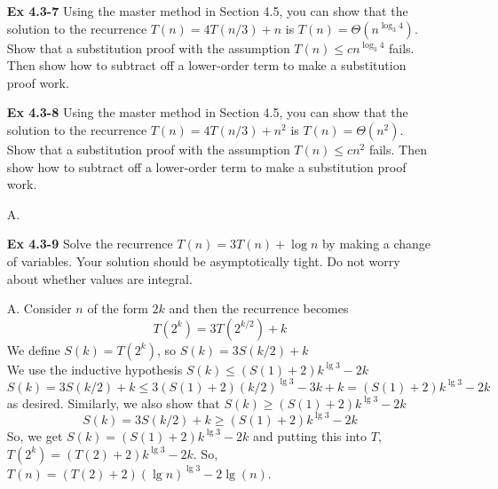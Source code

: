 \documentclass[fontsize=12pt,paper=a4]{book}
\begin{document}
\begin{enumerate}
	\item[\textbf{Ex 4.3-7}]
		Using the master method in Section 4.5, you can show that the solution to the recurrence $T(n) = 4T(n/3)+n$ is $T(n) = \Theta(n^{\log_3 4})$. Show that a substitution proof with the assumption $T(n) \leq cn^{\log_3 4}$ fails. Then show how to subtract off a lower-order term to make a substitution proof work.
		
	\item[\textbf{Ex 4.3-8}]
		Using the master method in Section 4.5, you can show that the solution to the recurrence $T(n) = 4T(n/3)+n^2$ is $T(n) = \Theta(n^2)$. Show that a substitution proof with the assumption $T(n) \leq cn^2$ fails. Then show how to subtract off a lower-order term to make a substitution proof work.
	\item[A.]

	\item[\textbf{Ex 4.3-9}]
		Solve the recurrence $T(n) = 3T(n) + \log n$ by making a change of variables. Your solution should be asymptotically tight. Do not worry about whether values are integral.
	\item[A.]
	Consider $n$ of the form $2k$ and then the recurrence becomes
	\[T(2^k) = 3T(2^{k/2}) + k\]
	We define $S(k) = T(2^k)$, so $S(k) = 3S(k/2) + k$ \\
	We use the inductive hypothesis $S(k) \leq (S(1)+2)k^{\lg 3} - 2k$
	\[ S(k) = 3S(k/2) + k \leq 3 (S(1) +2) (k/2)^{\lg 3} - 3k + k = (S(1) + 2)k^{\lg 3} - 2k \] 
	as desired. Similarly, we also show that $S(k) \geq (S(1) + 2)k^{\lg 3} - 2k$
	\[ S(k) = 3S(k/2) + k \geq (S(1) + 2)k^{\lg 3} - 2k\]
	So, we get $S(k) = (S(1) + 2)k^{\lg 3} - 2k$ and putting this into $T$, $T(2^k) = (T(2) + 2)k^{\lg 3} - 2k$. So, $T(n) = (T(2) + 2)(\lg n)^{\lg 3} - 2\lg(n)$.	
\end{enumerate}
\end{document}
